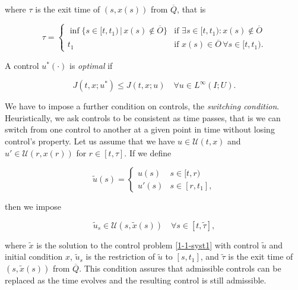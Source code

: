 where $\tau$ is the exit time of $(s,x(s))$ from $\overline{Q}$, that is

\begin{equation}\label{1-1-taudef}
    \tau = \begin{cases}
        \inf\{s\in [t,t_1)\,|\, x(s)\notin \overline{O}\} & \text{if } \exists s\in [t,t_1): x(s)\notin\overline{O} \\
        t_1 & \text{if }  x(s)\in\overline{O}\,\forall s\in [t,t_1).
    \end{cases}
\end{equation}

A control $u^{\ast}(\cdot)$ is \textit{optimal} if

\begin{equation}\label{1-1-optimalcondition}
    J(t,x;u^{\ast}) \leq J(t,x;u) \quad \forall u\in L^{\infty}(I;U).
\end{equation}

We have to impose a further condition on controls, the \textit{switching condition}. Heuristically, we ask controls to be consistent as time passes, that is we can switch from one control to another at a given point in time without losing control's property. 
Let us assume that we have $u\in\mathcal{U}(t,x)$ and $u'\in\mathcal{U}(r,x(r))$ for $r\in[t,\tau]$. If we define

\begin{equation}\label{1-1-switcond}
    \tilde{u}(s)=\begin{cases}
        u(s) & s\in[t,r) \\
        u'(s) & s\in[r,t_1],
    \end{cases}
\end{equation}

then we impose

\begin{equation}
    \tilde{u}_s\in\mathcal{U}(s,\tilde{x}(s)) \quad \forall s\in[t,\tilde{\tau}],
\end{equation}

where $\tilde{x}$ is the solution to the control problem \eqref{1-1-syst1} with control $\tilde{u}$ and initial condition $x$, 
$\tilde{u}_s$ is the restriction of $\tilde{u}$ to $[s,t_1]$, and $\tilde{\tau}$ is the exit time of $(s,\tilde{x}(s))$ from $\overline{Q}$.
This condition assures that admissible controls can be replaced as the time evolves and the resulting control is still admissible.
